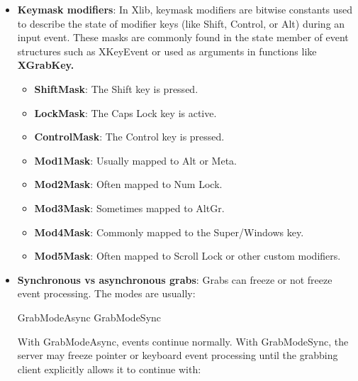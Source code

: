 \documentclass{report}
\begin{document}
\begin{itemize}
\begin{itemize}
                \item \textbf{AnyButton}: A special constant used in functions like XGrabButton to indicate that the operation should apply to any mouse button
            \end{itemize}
            \bigbreak \noindent 
            This is how a window manager can say:
            \begin{center}
                "\textit{When Mod1 + Button1 is pressed over this window, give me control.}"
            \end{center}
            \bigbreak \noindent 
            The grab becomes active only when the specified key/button/modifier combination occurs.
        \item \textbf{Keymask modifiers}: In Xlib, keymask modifiers are bitwise constants used to describe the state of modifier keys (like Shift, Control, or Alt) during an input event. These masks are commonly found in the state member of event structures such as XKeyEvent or used as arguments in functions like \textbf{XGrabKey.}
            \begin{itemize}
                \item \textbf{ShiftMask}: The Shift key is pressed.
                \item \textbf{LockMask}: The Caps Lock key is active.
                \item \textbf{ControlMask}: The Control key is pressed.
                \item \textbf{Mod1Mask}: Usually mapped to Alt or Meta.
                \item \textbf{Mod2Mask}: Often mapped to Num Lock.
                \item \textbf{Mod3Mask}: Sometimes mapped to AltGr.
                \item \textbf{Mod4Mask}: Commonly mapped to the Super/Windows key.
                \item \textbf{Mod5Mask}: Often mapped to Scroll Lock or other custom modifiers.
            \end{itemize}
        \item \textbf{Synchronous vs asynchronous grabs}: Grabs can freeze or not freeze event processing. The modes are usually:
            \bigbreak \noindent 
            \begin{cppcode}
            GrabModeAsync
            GrabModeSync
            \end{cppcode}
            \bigbreak \noindent 
            With GrabModeAsync, events continue normally. With GrabModeSync, the server may freeze pointer or keyboard event processing until the grabbing client explicitly allows it to continue with:

\end{itemize}
\end{document}
